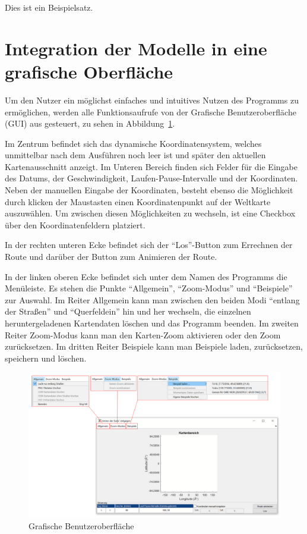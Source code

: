 \documentclass[
    paper=a4,
    DIV14,
    fontsize=12pt,
    pagesize=pdftex,
    toc=bibliographynumbered
]{scrartcl}
\numberwithin{figure}{section}
\numberwithin{equation}{section}
\numberwithin{table}{section}
\begin{document}
Dies ist ein Beispielsatz.

\section{Integration der Modelle in eine grafische Oberfläche}

Um den Nutzer ein möglichst einfaches und intuitives Nutzen des Programms zu ermöglichen,
werden alle Funktionsaufrufe von der Grafische Benutzeroberfläche (GUI) aus gesteuert,
zu sehen in Abbildung~\ref{fig:GUI}.

Im Zentrum befindet sich das dynamische Koordinatensystem, welches unmittelbar nach dem
Ausführen noch leer ist und später den aktuellen Kartenausschnitt anzeigt. Im Unteren
Bereich finden sich Felder für die Eingabe des Datums, der Geschwindigkeit,
Laufen-Pause-Intervalle und der Koordinaten. Neben der manuellen Eingabe der Koordinaten,
besteht ebenso die Möglichkeit durch klicken der Maustasten einen Koordinatenpunkt auf der
Weltkarte auszuwählen. Um zwischen diesen Möglichkeiten zu wechseln, ist eine Checkbox
über den Koordinatenfeldern platziert.

In der rechten unteren Ecke befindet sich der \enquote{Los}-Button zum Errechnen der Route
und darüber der Button zum Animieren der Route.

In der linken oberen Ecke befindet sich unter dem Namen des Programms die Menüleiste. Es
stehen die Punkte \enquote{Allgemein}, \enquote{Zoom-Modus} und \enquote{Beispiele} zur
Auswahl. Im Reiter Allgemein kann man zwischen den beiden Modi \enquote{entlang der
Straßen} und \enquote{Querfeldein} hin und her wechseln, die einzelnen heruntergeladenen
Kartendaten löschen und das Programm beenden. Im zweiten Reiter Zoom-Modus kann man den
Karten-Zoom aktivieren oder den Zoom zurücksetzen. Im dritten Reiter Beispiele kann man
Beispiele laden, zurücksetzen, speichern und löschen.

\begin{figure}[htb]
    \centering
    \includegraphics[width=1\textwidth]{images/gui.png}
    \caption{Grafische Benutzeroberfläche}
    \label{fig:GUI}
\end{figure}
\end{document}
